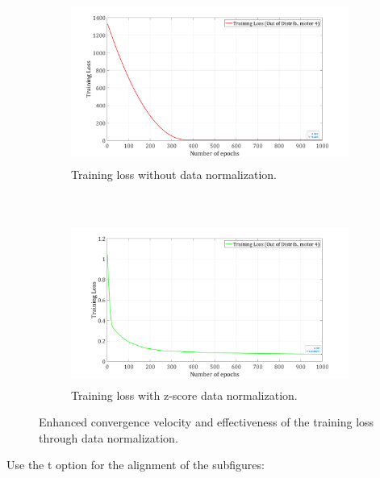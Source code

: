 \documentclass{ifacconf}
\begin{document}
\begin{figure}[t!]
	\centering
	\begin{subfigure}[b]{1.\columnwidth}
		\centering
		\includegraphics[height=2.1in]{./pictures/applications/Unormalized.png}
		\caption{Training loss without data normalization.}
	\end{subfigure}%
	~ 
	\begin{subfigure}[b]{1.\columnwidth}
		\centering
		\includegraphics[height=2.1in]{./pictures/applications/Normalized.png}
		\caption{Training loss with z-score data normalization.}
	\end{subfigure}
	\caption{Enhanced  convergence velocity and effectiveness of the training loss through data normalization.}
\end{figure}

Use the t option for the alignment of the subfigures:
\end{document}

